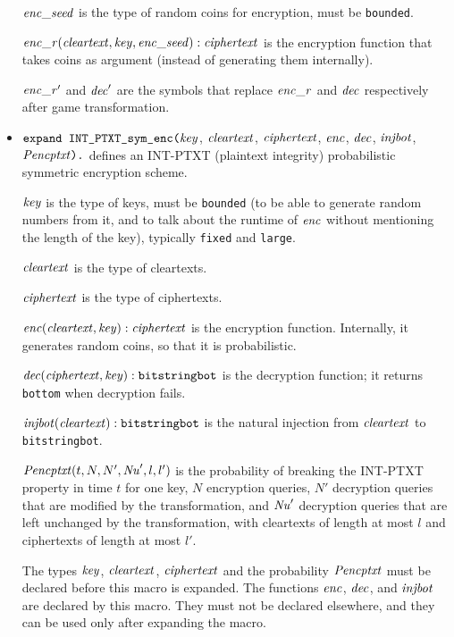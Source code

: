 \documentclass{article}
\begin{document}
\begin{itemize}
  $\mathit{enc\_seed}$ is the type of random coins for encryption, must be \texttt{bounded}.

  $\mathit{enc\_r}(\mathit{cleartext}, \mathit{key}, \mathit{enc\_seed}): \mathit{ciphertext}$ is the encryption function that takes coins as argument (instead of generating them internally).

  $\mathit{enc\_r}'$ and $\mathit{dec}'$ are the symbols that replace $\mathit{enc\_r}$ and $\mathit{dec}$ respectively after game transformation.


\item $\texttt{expand INT\_PTXT\_sym\_enc(}\mathit{key}$,
$  \mathit{cleartext}$, $\mathit{ciphertext}$, $\mathit{enc}$,
$  \mathit{dec}$, $\mathit{injbot}$, $\mathit{Pencptxt}\texttt{).}$ defines an INT-PTXT (plaintext integrity)
  probabilistic symmetric encryption scheme.

   $\mathit{key}$ is the type of keys, must be \texttt{bounded} (to be able to generate random numbers from it, and to talk about the runtime of $\mathit{enc}$ without mentioning the length of the key), typically \texttt{fixed} and \texttt{large}.

   $\mathit{cleartext}$ is the type of cleartexts.

   $\mathit{ciphertext}$ is the type of ciphertexts.

   $\mathit{enc}(\mathit{cleartext}, \mathit{key}): \mathit{ciphertext}$ is the encryption function. Internally, it generates random coins, so that it is probabilistic.

   $\mathit{dec}(\mathit{ciphertext}, \mathit{key}): \texttt{bitstringbot}$ is the
  decryption function; it returns \texttt{bottom} when decryption
  fails.

   $\mathit{injbot}(\mathit{cleartext}): \texttt{bitstringbot}$ is the natural
  injection from $\mathit{cleartext}$ to \texttt{bitstringbot}.

  $\mathit{Pencptxt}(t, N, N', \mathit{Nu}', l, l')$ is the probability of breaking the
  INT-PTXT property in time $t$ for one key, $N$ encryption queries, $N'$
  decryption queries that are modified by the transformation, and 
  $\mathit{Nu}'$ decryption queries that are left unchanged by the transformation,
  with cleartexts of length at most $l$ and
  ciphertexts of length at most $l'$.

   The types $\mathit{key}$, $\mathit{cleartext}$,
   $\mathit{ciphertext}$ and the probability $\mathit{Pencptxt}$ must
   be declared before this macro is expanded. The functions
   $\mathit{enc}$, $\mathit{dec}$, and $\mathit{injbot}$ are declared by this
   macro. They must not be declared elsewhere, and they can be used
   only after expanding the macro.


\end{itemize}
\end{document}
